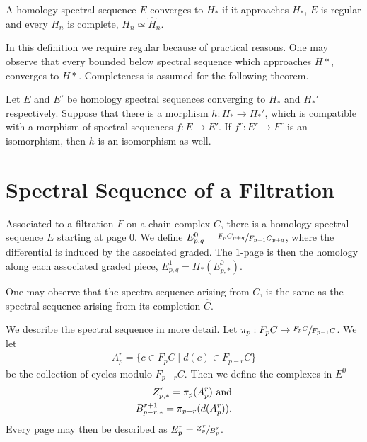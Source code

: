 \documentclass[../thesis.tex]{subfiles}
\begin{document}
        \begin{definition}[Convergence]
            A homology spectral sequence $E$ converges to $H_*$ if it approaches $H_*$, $E$ is regular and every $H_n$ is complete, $H_n \simeq \widehat{H}_n$.
        \end{definition}

        In this definition we require regular because of practical reasons. One may observe that every bounded below spectral sequence which approaches $H*$, converges to $H*$. Completeness is assumed for the following theorem. 

        \begin{thm}
            Let $E$ and $E'$ be homology spectral sequences converging to $H_*$ and $H_*'$ respectively. Suppose that there is a morphism $h : H_* \rightarrow H_*'$, which is compatible with a morphism of spectral sequences $f : E \rightarrow E'$. If $f^r : E^r \rightarrow F^r$ is an isomorphism, then $h$ is an isomorphism as well.
        \end{thm}

    \section{Spectral Sequence of a Filtration}

        Associated to a filtration $F$ on a chain complex $C$, there is a homology spectral sequence $E$ starting at page $0$. We define $E^0_{p,q} = \sfrac{F_pC_{p+q}}{F_{p-1}C_{p+q}}$, where the differential is induced by the associated graded. The $1$-page is then the homology along each associated graded piece, $E^1_{p,q} = H_*(E_{p,*}^0)$.

        One may observe that the spectra sequence arising from $C$, is the same as the spectral sequence arising from its completion $\widehat{C}$.

        We describe the spectral sequence in more detail. Let $\pi_p : F_pC \rightarrow \sfrac{F_pC}{F_{p-1}C}$. We let
        \begin{align*}
            A^r_p = \{c \in F_pC \mid d(c) \in F_{p-r}C\}
        \end{align*}
        be the collection of cycles modulo $F_{p-r}C$. Then we define the complexes in $E^0$
        \begin{align*}
            Z^r_{p,*} = \pi_p(A^r_p)\tt{ and}\\
            B^{r+1}_{p-r,*} = \pi_{p-r}(d(A^r_p))\tt{.}
        \end{align*}
        Every page may then be described as $E^r_p = \sfrac{Z^r_p}{B^r_p}$.
\end{document}
